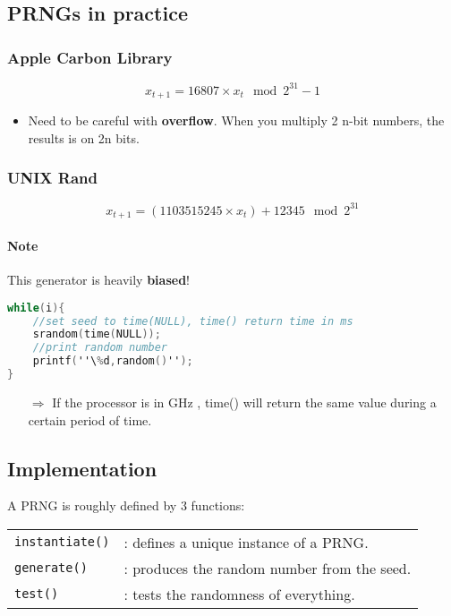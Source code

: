 \subsection{PRNGs in practice}

\subsubsection{Apple Carbon Library}
$$x_{t+1} = 16807 \times x_t \mod 2^{31} -1 $$

\begin{itemize}
    \item Need to be careful with \textbf{overflow}. 
        When you multiply 2 n-bit numbers, the results is on 2n bits.
        \end{itemize}

\subsubsection{UNIX Rand}
$$x_{t+1} = (1103515245 \times x_t) + 12345 \mod 2^{31}$$
\paragraph{Note} This generator is heavily \textbf{biased}!

\begin{lstlisting}[frame=single,language=C]
while(i){
	//set seed to time(NULL), time() return time in ms
	srandom(time(NULL)); 
	//print random number
	printf(''\%d,random()'');
}
\end{lstlisting}
\begin{itemize}
    \item[$\Rightarrow$] If the processor is in GHz , time() will return the
        same value during a certain period of time.
\end{itemize}


\subsection{Implementation}

A PRNG is roughly defined by 3 functions: \begin{tabular}{ll}
    \texttt{instantiate()} & : defines a unique instance of a PRNG.\\
    \texttt{generate()} & :  produces the random number from the seed.\\
    \texttt{test()} & : tests the randomness of everything.\\
\end{tabular}
